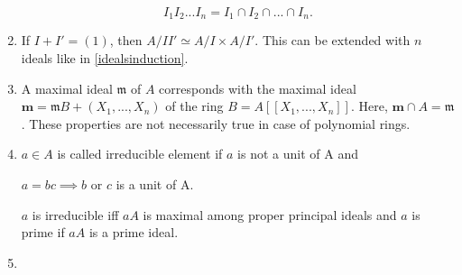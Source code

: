 \begin{enumerate}
            $$I_1I_2...I_n=I_1\cap I_2 \cap ... \cap I_n.$$
      \item
            If $I+I' = (1)$, then $A/II'\simeq A/I \times A/I'$. This can be
            extended with $n$ ideals like in \ref{idealsinduction}.
      \item
            A maximal ideal $\mathfrak{m}$ of $A$ corresponds with the maximal
            ideal $\mathbf{m}=\mathfrak{m}B + (X_1,...,X_n)$ of the ring
            $B=A[[X_1,...,X_n]]$. Here, $\mathbf{m}\cap A = \mathfrak{m}$. These
            properties are not necessarily true in case of polynomial rings.
      \item
            $a\in A$ is called irreducible element if $a$ is not a unit of A
            and \begin{center}
                  $a=bc\implies b $ or $c$ is a unit of A.
            \end{center}
            $a$ is irreducible iff $aA$ is maximal among proper principal ideals
            and $a$ is prime if $aA$ is a prime ideal.
      \item

\end{enumerate}